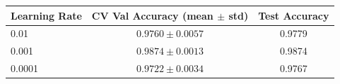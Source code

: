 \begin{tabular}{lcc}
\toprule
Learning Rate & CV Val Accuracy (mean $\pm$ std) & Test Accuracy \\
\midrule
  0.01 & $0.9760 \pm 0.0057$ & 0.9779 \\
  0.001 & $0.9874 \pm 0.0013$ & 0.9874 \\
  0.0001 & $0.9722 \pm 0.0034$ & 0.9767 \\
\bottomrule
\end{tabular}